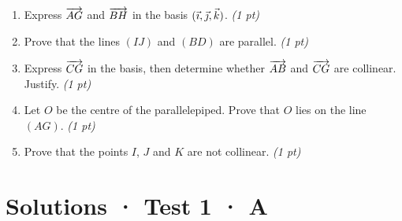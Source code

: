 \begin{enumerate}

\item Express $\overrightarrow{AG}$ and $\overrightarrow{BH}$ in the basis $(\vec{\imath},\vec{\jmath},\vec k)$. \hfill\textit{(1 pt)}

\item Prove that the lines $(IJ)$ and $(BD)$ are parallel. \hfill\textit{(1 pt)}

\item Express $\overrightarrow{CG}$ in the basis, then determine whether $\overrightarrow{AB}$ and $\overrightarrow{CG}$ are collinear. Justify. \hfill\textit{(1 pt)}

\item Let $O$ be the centre of the parallelepiped. Prove that $O$ lies on the line $(AG)$. \hfill\textit{(1 pt)}

\item Prove that the points $I$, $J$ and $K$ are not collinear. \hfill\textit{(1 pt)}

\end{enumerate}

\ifprof\clearpage

\section*{Solutions · Test 1 · A}\label{cor:1-3}

